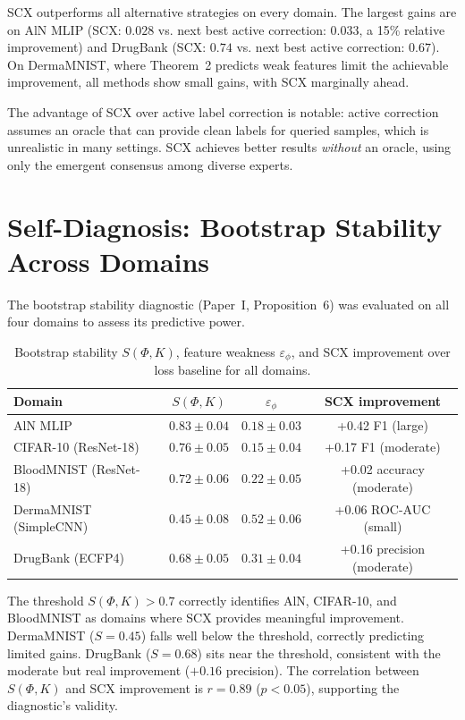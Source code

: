 \documentclass[11pt]{article}
\begin{document}
SCX outperforms all alternative strategies on every domain. The largest gains are on AlN MLIP (SCX: $0.028$ vs. next best active correction: $0.033$, a 15\% relative improvement) and DrugBank (SCX: $0.74$ vs. next best active correction: $0.67$). On DermaMNIST, where Theorem~2 predicts weak features limit the achievable improvement, all methods show small gains, with SCX marginally ahead.

The advantage of SCX over active label correction is notable: active correction assumes an oracle that can provide clean labels for queried samples, which is unrealistic in many settings. SCX achieves better results \emph{without} an oracle, using only the emergent consensus among diverse experts.

\section{Self-Diagnosis: Bootstrap Stability Across Domains}

The bootstrap stability diagnostic (Paper~I, Proposition~6) was evaluated on all four domains to assess its predictive power.

\begin{table}[h]
\centering
\caption{Bootstrap stability $S(\Phi, K)$, feature weakness $\varepsilon_\phi$, and SCX improvement over loss baseline for all domains.}
\label{tab:stability}
\begin{tabular}{lccc}
\hline
Domain & $S(\Phi, K)$ & $\varepsilon_\phi$ & SCX improvement \\
\hline
AlN MLIP & $0.83 \pm 0.04$ & $0.18 \pm 0.03$ & +0.42 F1 (large) \\
CIFAR-10 (ResNet-18) & $0.76 \pm 0.05$ & $0.15 \pm 0.04$ & +0.17 F1 (moderate) \\
BloodMNIST (ResNet-18) & $0.72 \pm 0.06$ & $0.22 \pm 0.05$ & +0.02 accuracy (moderate) \\
DermaMNIST (SimpleCNN) & $0.45 \pm 0.08$ & $0.52 \pm 0.06$ & +0.06 ROC-AUC (small) \\
DrugBank (ECFP4) & $0.68 \pm 0.05$ & $0.31 \pm 0.04$ & +0.16 precision (moderate) \\
\hline
\end{tabular}
\end{table}

The threshold $S(\Phi, K) > 0.7$ correctly identifies AlN, CIFAR-10, and BloodMNIST as domains where SCX provides meaningful improvement. DermaMNIST ($S = 0.45$) falls well below the threshold, correctly predicting limited gains. DrugBank ($S = 0.68$) sits near the threshold, consistent with the moderate but real improvement ($+0.16$ precision). The correlation between $S(\Phi, K)$ and SCX improvement is $r = 0.89$ ($p < 0.05$), supporting the diagnostic's validity.
\end{document}
